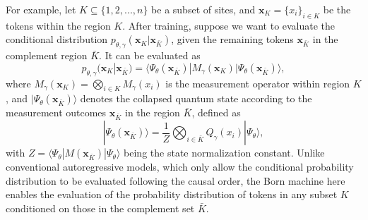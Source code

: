 \documentclass[aps,prb,twocolumn,superscriptaddress]{revtex4-2}
\newcommand{\bra}[1]{\langle #1|}
\newcommand{\ket}[1]{|#1 \rangle}
\newcommand{\vect}[1]{{\bm{#1}}}
\begin{document}
For example, let $K\subseteq\{1,2,...,n\}$ be a subset of sites, and $\vect{x}_{K}=\{x_i\}_{i\in K}$ be the tokens within the region $K$. After training, suppose we want to evaluate the conditional distribution $p_{\theta,\gamma}(\vect{x}_K|\vect{x}_{\bar{K}})$, given the remaining tokens $\vect{x}_{\bar{K}}$ in the complement region $\bar{K}$. It can be evaluated as
\begin{equation}\label{eq: single site}
    p_{\theta,\gamma}(\vect{x}_K|\vect{x}_{\bar{K}})=\bra{\Psi_\theta(\vect{x}_{\bar{K}})}M_{\gamma}(\vect{x}_K)\ket{\Psi_\theta(\vect{x}_{\bar{K}})},
\end{equation}
where $M_{\gamma}(\vect{x}_K)=\bigotimes_{i\in K}M_{\gamma}(x_i)$ is the measurement operator within region $K$, and $\ket{\Psi_\theta(\vect{x}_{\bar{K}})}$ denotes the collapsed quantum state according to the measurement outcomes $\vect{x}_{\bar{K}}$ in the region $\bar{K}$, defined as
\begin{equation}
\ket{\Psi_\theta(\vect{x}_{\bar{K}})}=\frac{1}{Z}\bigotimes_{i\in\bar{K}}Q_{\gamma}(x_i)\ket{\Psi_{\theta}},
\end{equation}
with $Z=\bra{\Psi_\theta}M(\vect{x}_{\bar{K}})\ket{\Psi_\theta}$ being the state normalization constant.
Unlike conventional autoregressive models, which only allow the conditional probability distribution to be evaluated following the causal order, the Born machine here enables the evaluation of the probability distribution of tokens in any subset $K$ conditioned on those in the complement set $\bar{K}$. 
\end{document}
